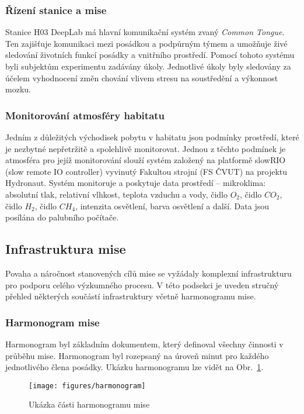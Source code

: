\subsubsection{Řízení stanice a mise}
\label{subsubsec:rizeni_stanice_mise}
Stanice H03 DeepLab má hlavní komunikační systém zvaný \textit{Common Tongue}.
Ten zajišťuje komunikaci mezi posádkou a podpůrným týmem a umožňuje živé
sledování životních funkcí posádky a vnitřního prostředí. Pomocí tohoto systému
byli subjektům experimentu zadávány úkoly. Jednotlivé úkoly byly sledovány za
účelem vyhodnocení změn chování vlivem stresu na soustředění a výkonnost mozku.

\subsubsection{Monitorování atmosféry habitatu}
Jedním z důležitých východisek pobytu v habitatu jsou podmínky prostředí, které
je nezbytné nepřetržitě a spolehlivě monitorovat. Jednou z těchto podmínek je
atmosféra pro jejíž monitorování slouží systém založený na platformě slowRIO
(slow remote IO controller) vyvinutý Fakultou strojní (FS ČVUT) na projektu
Hydronaut. Systém monitoruje a poskytuje data prostředí -- mikroklima: absolutní
tlak, relativní vlhkost, teplota vzduchu a vody, čidlo $O_2$, čidlo $CO_2$,
čidlo $H_2$, čidlo $CH_4$, intenzita osvětlení, barva osvětlení a další. Data
jsou posílána do palubního počítače.

\subsection{Infrastruktura mise}
\label{subsec:infrastruktura_mise}
Povaha a náročnost stanovených cílů mise se vyžádaly komplexní infrastrukturu
pro podporu celého výzkumného procesu. V této podsekci je uveden stručný přehled
některých součástí infrastruktury včetně harmonogramu mise.

\subsubsection{Harmonogram mise}
\label{subsubsec:harmonogram_mise}
Harmonogram byl základním dokumentem, který definoval všechny činnosti v průběhu
mise. Harmonogram byl rozepsaný na úroveň minut pro každého jednotlivého člena
posádky. Ukázku harmonogramu lze vidět na Obr.~\ref{fig:harmonogram}.

\begin{figure}[h]
    \begin{center}
        \begin{framed}
            \texttt{[image: figures/harmonogram]}
        \end{framed}
        \caption{Ukázka části harmonogramu mise}
        \label{fig:harmonogram}
    \end{center}
\end{figure}

